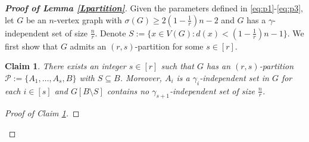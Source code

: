\documentclass[11pt, a4paper]{article}
\newtheorem{claim}[theorem]{Claim}
\theoremstyle{definition}
\newcommand{\<}{\subseteq}
\begin{document}
\begin{proof}[\bf Proof of Lemma \ref{Lpartition}]



Given the parameters defined in \eqref{eq:p1}-\eqref{eq:p3}, let $G$ be an $n$-vertex graph with
$\sigma(G)\ge 2\left(1-\frac{1}{r}\right)n-2$
and $G$ has a $\gamma$-independent set of size $\frac{n}{r}$. Denote $S:=\{x\in V(G):d(x)<(1-\frac{1}{r})n-1\}.$ %
We first show that $G$ admits an $(r,s)$-partition for some $s\in [r]$.  %
\begin{claim}\label{rs-partition}
    There exists an integer $s\in [r]$ such that $G$ has an $(r,s)$-partition $\mathcal{P}:=\{A_1,\dots,A_s,B\}$ with $S\subseteq B$. Moreover, $A_i$ is a $\gamma_i$-independent set in $G$ for each  $i\in [s]$ and $G[B\setminus S]$ contains no $\gamma_{s+1}$-independent set of size $\frac{n}{r}$.
\end{claim}

\begin{proof}[Proof of Claim \ref{rs-partition}]



\end{proof}
\end{proof}
\end{document}
